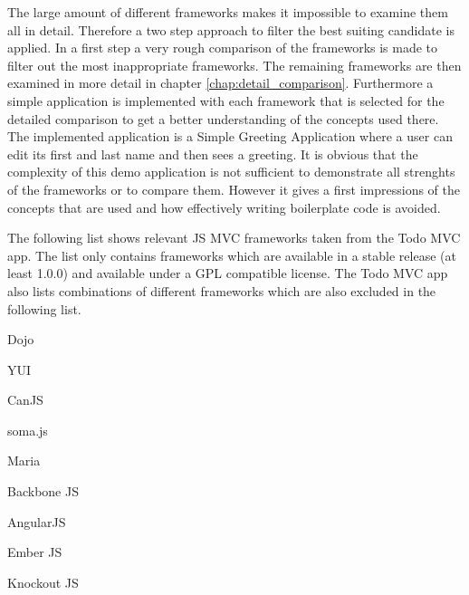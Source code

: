 The large amount of different frameworks makes it impossible to examine them all in detail.
Therefore a two step approach to filter the best suiting candidate is applied.
In a first step a very rough comparison of the frameworks is made to filter out the most inappropriate frameworks.
The remaining frameworks are then examined in more detail in chapter \ref{chap:detail_comparison}.
Furthermore a simple application is implemented with each framework that is selected for the detailed comparison to get a better understanding of the concepts used there.
The implemented application is a Simple Greeting Application where a user can edit its first and last name and then sees a greeting. 
It is obvious that the complexity of this demo application is not sufficient to demonstrate all strenghts of the frameworks or to compare them. However it gives a first impressions of the concepts that are used and how effectively writing boilerplate code is avoided.

   
The following list shows relevant JS MVC frameworks taken from the Todo MVC app.
The list only contains frameworks which are available in a stable release (at least 1.0.0) and available under a GPL compatible license.
The Todo MVC app also lists combinations of different frameworks which are also excluded in the following list.\\

\begin{itemize}
\begin{minipage}{0.5\textwidth}

	\item Dojo
	\item YUI
	\item CanJS
	\item soma.js
	\item Maria
\end{minipage}
\begin{minipage}{0.5\textwidth}

	\item Backbone JS
	\item AngularJS
	\item Ember JS
	\item Knockout JS
	\end{minipage}
\end{itemize}
\\

